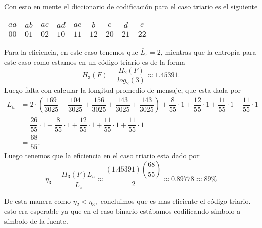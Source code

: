 \begin{sols}
\begin{center}
    \end{center}
Con esto en mente el diccionario de codificación para el caso triario es el siguiente
\begin{center}
  \begin{tabular}{|c|c|c|c|c|c|c|c|c|}
  \hline
$aa$ & $ab$ & $ac$ & $ad$ & $ae$ & $b$ & $c$ & $d$ & $e$\\
\hline
$00$ & $01$ & $02$ & $10$ & $11$ & $12$ & $20$ & $21$ & $22$\\
\hline
 \end{tabular}
 \end{center}
Para la eficiencia, en este caso tenemos que $\overline{L}_z=2$, mientras que la entropía para este caso como estamos en un código triario es de la forma
$$H_3(F)=\dfrac{H_2(F)}{log_2(3)}\approx1.45391.$$
Luego falta con calcular la longitud promedio de mensaje, que esta dada por
\begin{align*}
    \overline{L}_u&=2\cdot\left(\dfrac{169}{3025}+\dfrac{104}{3025}+\dfrac{156}{3025}+\dfrac{143}{3025}+\dfrac{143}{3025}\right)+\dfrac{8}{55}\cdot1+\dfrac{12}{55}\cdot1+\dfrac{11}{55}\cdot1+\dfrac{11}{55}\cdot1\\
    &=\dfrac{26}{55}\cdot1+\dfrac{8}{55}\cdot1+\dfrac{12}{55}\cdot1+\dfrac{11}{55}\cdot1+\dfrac{11}{55}\cdot1\\
   &=\dfrac{68}{55}. 
\end{align*}
Luego tenemos que la eficiencia en el caso triario esta dado por
$$\eta_3=\dfrac{H_3(F)\overline{L}_u}{\overline{L}_z}\approx\dfrac{(1.45391)\left(\dfrac{68}{55}\right)}{2}\approx 0.89778\approx 89\%$$

De esta manera como $\eta_2<\eta_3,$ concluimos que es mas eficiente el código triario. esto era esperable ya que en el caso binario estábamos codificando símbolo a símbolo de la fuente.

\end{sols}